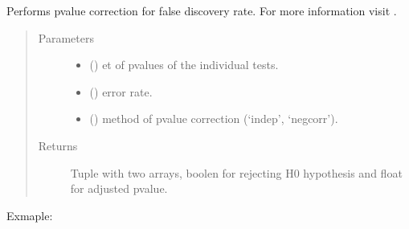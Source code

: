 \documentclass[letterpaper,10pt,english]{sphinxmanual}
\begin{document}
\begin{fulllineitems}
\label{\detokenize{_autosummary/analytics_core.analytics:analytics_core.analytics.analytics.apply_pvalue_fdrcorrection}}
Performs p\sphinxhyphen{}value correction for false discovery rate. For more information visit .
\begin{quote}\begin{description}
\item[{Parameters}] \leavevmode\begin{itemize}
\item {} 
 () \textendash{} et of p\sphinxhyphen{}values of the individual tests.

\item {} 
 () \textendash{} error rate.

\item {} 
 () \textendash{} method of p\sphinxhyphen{}value correction (‘indep’, ‘negcorr’).

\end{itemize}

\item[{Returns}] \leavevmode
Tuple with two arrays, boolen for rejecting H0 hypothesis and float for adjusted p\sphinxhyphen{}value.

\end{description}\end{quote}

Exmaple:

\begin{sphinxVerbatim}[commandchars=\\\{\}]
    
\end{sphinxVerbatim}

\end{fulllineitems}
\end{document}
